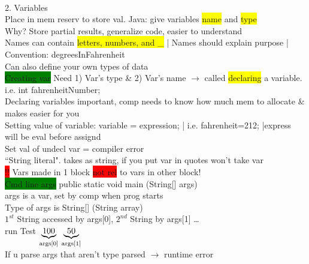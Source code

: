 ~\\ \color{Brown}
2. Variables
\\ Place in mem reserv to store val. Java: give variables \colorbox{yellow}{name} and \colorbox{yellow}{type}
\\ Why? Store partial results, generalize code, easier to understand
\\ Names can contain \colorbox{yellow}{letters, numbers, and \_} | Names should explain purpose | Convention: degreesInFahrenheit
\\ Can also define your own types of data
%
\\ \colorbox{Green}{Creating var} Need 1) Var's type \& 2) Var's name $\rightarrow$ called \colorbox{yellow}{declaring} a variable. i.e. int fahrenheitNumber;
\\ Declaring variables important, comp needs to know how much mem to allocate \& makes easier for you
\\ Setting value of variable: variable = expression; | i.e. fahrenheit=212; |express will be eval before assignd
\\ Set val of undecl var = compiler error
\\ ``String literal". takes as string, if you put var in quotes won't take var
%
\\\colorbox{Red}{!!} Vars made in 1 block \colorbox{red}{not rel} to vars in other block!
%
\\ \colorbox{Green}{Cmd line args} public static void main (String[] args)
\\ args is a var, set by comp when prog starts
\\ Type of args is String[] (String array)
\\ $1^{st}$ String accessed by args[0], $2^{nd}$ String by args[1] \ldots
\\ run Test $\underbrace{100}_{\textnormal{args[0]}}$ $\underbrace{50}_{\textnormal{args[1]}}$
\\ If u parse args that aren't type parsed $\rightarrow$ runtime error